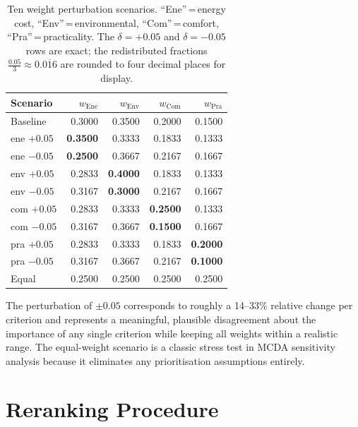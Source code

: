 \documentclass[11pt]{article}
\begin{document}
\begin{table}[ht]
\centering
\caption{Ten weight perturbation scenarios. ``Ene''\,=\,energy cost,
  ``Env''\,=\,environmental, ``Com''\,=\,comfort, ``Pra''\,=\,practicality.
  The $\delta = +0.05$ and $\delta = -0.05$ rows are exact;
  the redistributed fractions $\tfrac{0.05}{3} \approx 0.0\overline{1}6$
  are rounded to four decimal places for display.}
\label{tab:weight-scenarios}
\begin{tabular}{lrrrr}
  \toprule
  Scenario     & $w_{\text{Ene}}$ & $w_{\text{Env}}$ & $w_{\text{Com}}$ & $w_{\text{Pra}}$ \\
  \midrule
  Baseline     & 0.3000 & 0.3500 & 0.2000 & 0.1500 \\
  \midrule
  ene $+0.05$  & \textbf{0.3500} & 0.3333 & 0.1833 & 0.1333 \\
  ene $-0.05$  & \textbf{0.2500} & 0.3667 & 0.2167 & 0.1667 \\
  \midrule
  env $+0.05$  & 0.2833 & \textbf{0.4000} & 0.1833 & 0.1333 \\
  env $-0.05$  & 0.3167 & \textbf{0.3000} & 0.2167 & 0.1667 \\
  \midrule
  com $+0.05$  & 0.2833 & 0.3333 & \textbf{0.2500} & 0.1333 \\
  com $-0.05$  & 0.3167 & 0.3667 & \textbf{0.1500} & 0.1667 \\
  \midrule
  pra $+0.05$  & 0.2833 & 0.3333 & 0.1833 & \textbf{0.2000} \\
  pra $-0.05$  & 0.3167 & 0.3667 & 0.2167 & \textbf{0.1000} \\
  \midrule
  Equal        & 0.2500 & 0.2500 & 0.2500 & 0.2500 \\
  \bottomrule
\end{tabular}
\end{table}

The perturbation of $\pm 0.05$ corresponds to roughly a 14--33\% relative
change per criterion and represents a meaningful, plausible disagreement
about the importance of any single criterion while keeping all weights
within a realistic range.  The equal-weight scenario is a classic stress
test in MCDA sensitivity analysis because it eliminates any prioritisation
assumptions entirely.

\section{Reranking Procedure}
\label{sec:reranking}
\end{document}
